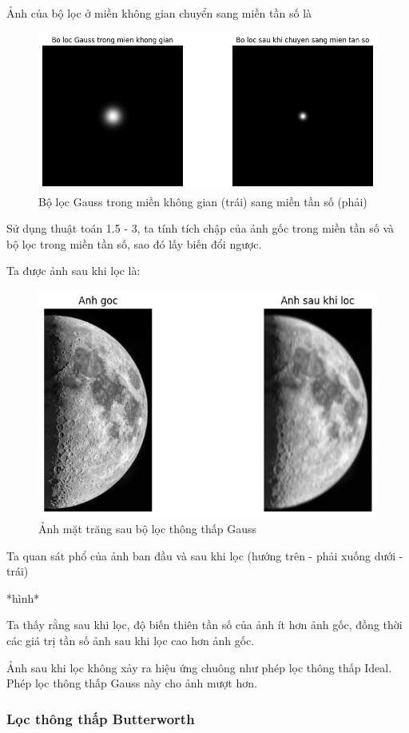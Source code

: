 \documentclass[12pt,a4paper]{report}
\numberwithin{equation}{section}
\theoremstyle{definition} %
\begin{document}
Ảnh của bộ lọc ở miền không gian chuyển sang miền tần số là 
\begin{figure}[H]
\centering
\includegraphics[width=0.8\linewidth]{img/LPG-spacedomainTo-frequency.png}
\caption{Bộ lọc Gauss trong miền không gian (trái) sang miền tần số (phải)}
\end{figure}
Sử dụng thuật toán 1.5 - 3, ta tính tích chập của ảnh gốc trong miền tần số và bộ lọc trong miền tần số, sao đó lấy biến đổi ngược.

Ta được ảnh sau khi lọc là:
\begin{figure}[H]
\centering
\includegraphics[width=0.8\linewidth]{img/anhsauLocLowpass.png}
\caption{Ảnh mặt trăng sau bộ lọc thông thấp Gauss}
\end{figure}
Ta quan sát phổ của ảnh ban đầu và sau khi lọc (hướng trên - phải xuống dưới - trái)

*hình*

Ta thấy rằng sau khi lọc, độ biến thiên tần số của ảnh ít hơn ảnh gốc, đồng thời các giá trị tần số ảnh sau khi lọc cao hơn ảnh gốc.

Ảnh sau khi lọc không xảy ra hiệu ứng chuông như phép lọc thông thấp Ideal. Phép lọc thông thấp Gauss này cho ảnh mượt hơn.
\subsubsection{Lọc thông thấp Butterworth}
\end{document}
